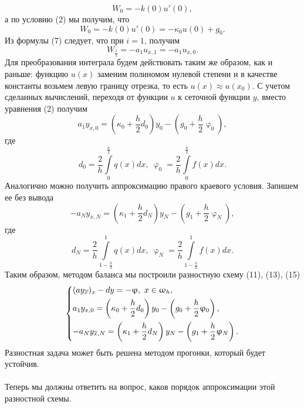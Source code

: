 \documentclass[a4paper, 12pt]{report}
\numberwithin{equation}{section}
\newcommand{\ol}{\overline}
\renewcommand{\varphi}{\upvarphi}
\renewcommand{\omega}{\upomega}
\begin{document}
	$$W_0 = -k(0)u'(0),$$
	а по условию (2) мы получим, что
	$$W_0 = -k(0)u'(0) = -\kappa_0 u(0) + g_0.$$
	Из формулы (7) следует, что при $i=1$, получим
	$$W_{\frac 12} = -a_1 u_{\ol x, 1} = -a_1 u_{x,0}.$$
	Для преобразования интеграла будем действовать таким же образом, как и раньше: функцию $u(x)$ заменим полиномом нулевой степени и в качестве константы возьмем левую границу отрезка, то есть $u(x)\approx u(x_0)$. С учетом сделанных вычислений, переходя от функции $u$ к сеточной функции $y$, вместо уравнения (2) получим
	\begin{equation}
		a_1 y_{x,0} = \left(\kappa_0 + \dfrac h2 d_0\right)y_0 - \left(g_0 + \dfrac h2 \varphi_0\right),
	\end{equation}
	где \begin{equation}
		d_0 = \dfrac2h \int\limits_0^{\frac h2}q(x)dx,\ \varphi_0 = \dfrac 2h \int\limits_0^{\frac h2}f(x)dx.
	\end{equation}
	Аналогично можно получить аппроксимацию правого краевого условия. Запишем ее без вывода
	\begin{equation}
		-a_N y_{\ol x, N} = \left(\kappa_1 + \dfrac h2 d_N\right)y_N - \left(g_1 + \dfrac h2 \varphi_N\right),
	\end{equation}
	где
	\begin{equation}
		d_N = \dfrac2h \int\limits_{1-\frac h2}^1 q(x)dx,\ \varphi_N = \dfrac 2h \int\limits_{1-\frac h2}^1f(x)dx.
	\end{equation}
	Таким образом, методом баланса мы построили разностную схему (11), (13), (15)
	$$\begin{dcases}
		(a y_{\ol x})_x - dy = -\varphi,\ x \in \omega_h, \\
		a_1 y_{x,0} = \left(\kappa_0 + \dfrac h2 d_0\right)y_0 - \left(g_0 + \dfrac h2 \varphi_0\right),\\
		-a_N y_{\ol x, N} = \left(\kappa_1 + \dfrac h2 d_N\right)y_N - \left(g_1 + \dfrac h2 \varphi_N\right).
	\end{dcases}$$
	Разностная задача может быть решена методом прогонки, который будет устойчив.\\\\
	Теперь мы должны ответить на вопрос, каков порядок аппроксимации этой разностной схемы.
\end{document}
